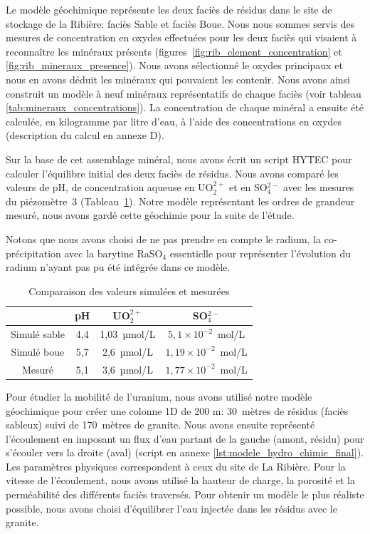 \documentclass{article}
\begin{document}
Le modèle géochimique représente les deux faciès de résidus dans le site de stockage de la Ribière: faciès Sable et faciès Boue.
Nous nous sommes servis des mesures de concentration en oxydes effectuées pour les deux faciès qui visaient à reconnaître les minéraux présents (figures~\ref{fig:rib_element_concentration} et \ref{fig:rib_mineraux_presence}). Nous avons sélectionné le oxydes principaux et nous en avons déduit les minéraux qui pouvaient les contenir. Nous avons ainsi construit un modèle à neuf minéraux représentatifs de chaque faciès (voir tableau \ref{tab:mineraux_concentrations}). La concentration de chaque minéral a ensuite été calculée, en kilogramme par litre d’eau, à l’aide des concentrations en oxydes (description du calcul en annexe D).

Sur la base de cet assemblage minéral, nous avons écrit un script HYTEC pour calculer l’équilibre initial des deux faciès de résidus. Nous avons comparé les valeurs de pH, de concentration aqueuse en UO$_2^{2+}$ et en SO$_4^{2-}$ avec les mesures du piézomètre~3 (Tableau~\ref{tab:comparaison_valeurs_simul_mesure}). Notre modèle représentant les ordres de grandeur mesuré, nous avons gardé cette géochimie pour la suite de l'étude. 

Notons que nous avons choisi de ne pas prendre en compte le radium, la co-précipitation avec la barytine RaSO$_4$ essentielle pour représenter l'évolution du radium n'ayant pas pu été intégrée dans ce modèle.

	
\begin{table}[H]
    \centering    
    \caption{Comparaison des valeurs simulées et mesurées}
    \begin{tabular}{ |c |c |c |c |}
        \hline
         \textbf{} & \textbf{pH} & \textbf{UO$_2^{2+}$} & \textbf{SO$_4^{2-}$}\\ 
         \hline
         Simulé sable & 4,4 & 1,03~µmol/L & $5,1 \times 10^{-2}$~mol/L \\ 
         \hline
         Simulé boue & 5,7 & 2,6~µmol/L & $1,19 \times 10^{-2}$~mol/L  \\
         \hline
        Mesuré & 5,1 & 3,6~µmol/L & $1,77 \times 10^{-2}$~mol/L  \\
         \hline
    \end{tabular}

    \label{tab:comparaison_valeurs_simul_mesure}
\end{table}


Pour étudier la mobilité de l’uranium, nous avons utilisé notre modèle géochimique pour créer une colonne 1D de 200 m: 30~mètres de résidus (faciès sableux) suivi de 170~mètres de granite. Nous avons ensuite représenté l'écoulement en imposant un flux d’eau partant de la gauche (amont, résidu) pour s’écouler vers la droite (aval) (script en annexe \ref{lst:modele_hydro_chimie_final}). Les paramètres physiques correspondent à ceux du site de La Ribière. Pour la vitesse de l’écoulement, nous avons utilisé la hauteur de charge, la porosité et la perméabilité des différents faciès traversés. Pour obtenir un modèle le plus réaliste possible, nous avons choisi d’équilibrer l’eau injectée dans les résidus avec le granite.
\end{document}
